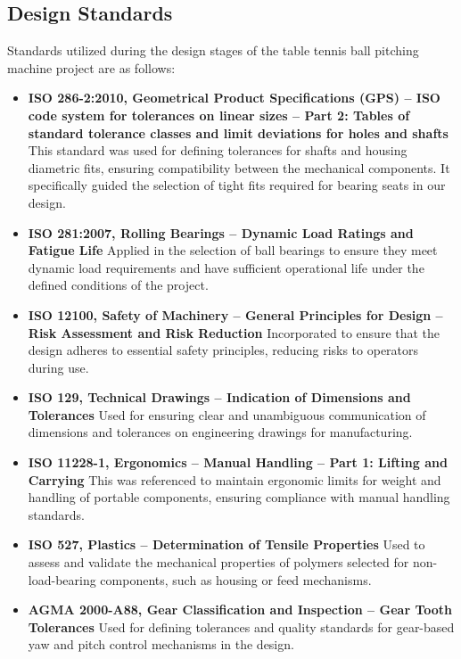 \documentclass[12pt]{article}
\begin{document}
\subsection{Design Standards}
Standards utilized during the design stages of the table tennis ball pitching machine project are as follows:
\begin{itemize}
    \item \textbf{ISO 286-2:2010, Geometrical Product Specifications (GPS) – ISO code system for tolerances on linear sizes – Part 2: Tables of standard tolerance classes and limit deviations for holes and shafts}
    This standard was used for defining tolerances for shafts and housing diametric fits, ensuring compatibility between the mechanical components. It specifically guided the selection of tight fits required for bearing seats in our design.
    
    \item \textbf{ISO 281:2007, Rolling Bearings – Dynamic Load Ratings and Fatigue Life}
    Applied in the selection of ball bearings to ensure they meet dynamic load requirements and have sufficient operational life under the defined conditions of the project.
    
    \item \textbf{ISO 12100, Safety of Machinery – General Principles for Design – Risk Assessment and Risk Reduction}
    Incorporated to ensure that the design adheres to essential safety principles, reducing risks to operators during use.
    
    \item \textbf{ISO 129, Technical Drawings – Indication of Dimensions and Tolerances}
    Used for ensuring clear and unambiguous communication of dimensions and tolerances on engineering drawings for manufacturing.
    
    \item \textbf{ISO 11228-1, Ergonomics – Manual Handling – Part 1: Lifting and Carrying}
    This was referenced to maintain ergonomic limits for weight and handling of portable components, ensuring compliance with manual handling standards.
    
    \item \textbf{ISO 527, Plastics – Determination of Tensile Properties}
    Used to assess and validate the mechanical properties of polymers selected for non-load-bearing components, such as housing or feed mechanisms.
    
    \item \textbf{AGMA 2000-A88, Gear Classification and Inspection – Gear Tooth Tolerances}
    Used for defining tolerances and quality standards for gear-based yaw and pitch control mechanisms in the design.
    

\end{itemize}
\end{document}
